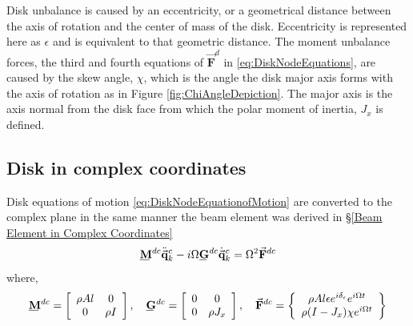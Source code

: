 \par
 Disk unbalance is caused by an eccentricity, or a geometrical distance between the axis of rotation and the center of mass of the disk. Eccentricity is represented here as $\epsilon$ and is equivalent to that geometric distance. The moment unbalance forces, the third and fourth equations of $ \vec{\mathbf{F}}^d $ in \eqref{eq:DiskNodeEquations}, are caused by the skew angle, $ \chi $, which is the angle the disk major axis forms with the axis of rotation as in Figure \ref{fig:ChiAngleDepiction}. The major axis is the axis normal from the disk face from which the polar moment of inertia, $ J_x $ is defined.
 \subsection{Disk in complex coordinates} \label{Disk in complex coordinates}
 Disk equations of motion \eqref{eq:DiskNodeEquationofMotion} are converted to the complex plane in the same manner the beam element was derived in \S\ref{Beam Element in Complex Coordinates}
 \begin{equation}\label{eq:DiskNodeEquationofMotionComplex}
 \bunderline{\mathbf{M}}^{dc}\ddot{\vec{\mathbf{q}}}^c_k-i\Omega\bunderline{\mathbf{G}}^{dc}\dot{\vec{\mathbf{q}}}^c_k=\Omega^2\vec{\mathbf{F}}^{dc}
 \end{equation}
 where,
 \begin{equation*}
 \bunderline{\mathbf{M}}^{dc}=\left[\begin{array}{cc}
 \rho Al&0\\
 0&\rho I
 \end{array}\right],\quad
 \bunderline{\mathbf{G}}^{dc}=\left[\begin{array}{cc}
 0&0\\
 0&\rho J_x
 \end{array}\right],\quad
 \vec{\mathbf{F}}^{dc}=\left\{\begin{array}{c}
 \rho A l \epsilon e^{i\delta_\epsilon}e^{i\Omega t}\\
 \rho(I-J_x)\chi e^{i\Omega t}
 \end{array}\right\}
 \end{equation*}
%
%
